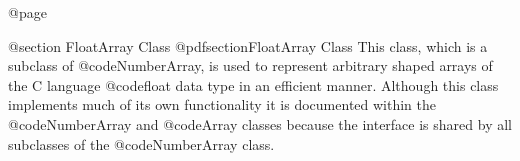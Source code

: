 @page

@section  FloatArray Class
@pdfsection{FloatArray Class}
This class, which is a subclass of @code{NumberArray}, is used to
represent arbitrary shaped arrays of the C language @code{float} data
type in an efficient manner.  Although this class implements much of its
own functionality it is documented within the @code{NumberArray} and
@code{Array} classes because the interface is shared by all subclasses
of the @code{NumberArray} class.









